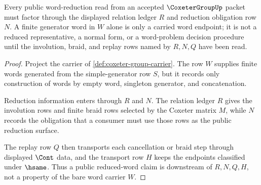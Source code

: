 \begin{theorem}
\label{thm:coxeter-group-word-reduction-obligation}
Every public word-reduction read from an accepted $\CoxeterGroupUp$ packet must factor through the displayed relation ledger $R$ and reduction obligation row $N$. A finite generator word in $W$ alone is only a carried word endpoint; it is not a reduced representative, a normal form, or a word-problem decision procedure until the involution, braid, and replay rows named by $R,N,Q$ have been read.
\end{theorem}
\begin{proof}
Project the carrier of \autoref{def:coxeter-group-carrier}. The row $W$ supplies finite words generated from the simple-generator row $S$, but it records only construction of words by empty word, singleton generator, and concatenation.

Reduction information enters through $R$ and $N$. The relation ledger $R$ gives the involution rows and finite braid rows selected by the Coxeter matrix $M$, while $N$ records the obligation that a consumer must use those rows as the public reduction surface.

The replay row $Q$ then transports each cancellation or braid step through displayed $\Cont$ data, and the transport row $H$ keeps the endpoints classified under $\hsame$. Thus a public reduced-word claim is downstream of $R,N,Q,H$, not a property of the bare word carrier $W$.
\end{proof}

